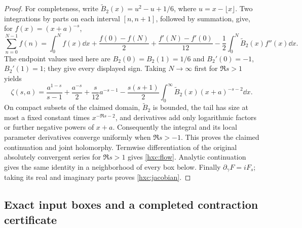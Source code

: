 \begin{proof}
For completeness, write \(\widetilde B_2(x)=u^2-u+1/6\), where
\(u=x-\lfloor x\rfloor\). Two integrations by parts on each interval
\([n,n+1]\), followed by summation, give, for
\(f(x)=(x+a)^{-s}\),
\[
 \sum_{n=0}^{N-1}f(n)
 =\int_0^N f(x)\dd x+\frac{f(0)-f(N)}2
  +\frac{f'(N)-f'(0)}{12}
  -\frac12\int_0^N\widetilde B_2(x)f''(x)\dd x.
\]
The endpoint values used here are \(B_2(0)=B_2(1)=1/6\) and
\(B_2'(0)=-1\), \(B_2'(1)=1\); they give every displayed sign.
Taking \(N\to\infty\) first for \(\Re s>1\) yields
\begin{equation}\label{hxc:continuation}
 \zeta(s,a)=\frac{a^{1-s}}{s-1}+\frac{a^{-s}}2
  +\frac{s}{12}a^{-s-1}
  -\frac{s(s+1)}2\int_0^\infty
       \widetilde B_2(x)(x+a)^{-s-2}\dd x.
\end{equation}
On compact subsets of the claimed domain, \(\widetilde B_2\) is bounded,
the tail has size at most a fixed constant times \(x^{-\Re s-2}\),
and derivatives add only logarithmic factors or further negative powers
of \(x+a\). Consequently the integral and its local parameter
derivatives converge uniformly when \(\Re s>-1\). This proves the
claimed continuation and joint holomorphy. Termwise differentiation of
the original absolutely convergent series for \(\Re s>1\) gives
\eqref{hxc:flow}. Analytic continuation gives the same identity in a
neighborhood of every box below. Finally \(\partial_\gamma F=iF_s\);
taking its real and imaginary parts proves \eqref{hxc:jacobian}.
\end{proof}

\subsection{Exact input boxes and a completed contraction certificate}

